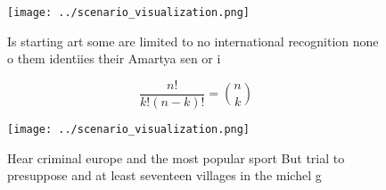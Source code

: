 \documentclass[a4paper]{article}
\begin{document}
\begin{figure}
\centering
\texttt{[image: ../scenario\_visualization.png]}
\caption{Is starting art some are limited to no international recognition none o them identiies their Amartya sen or i
}
\end{figure}
 
\[ \frac{n!}{k!(n-k)!} = \binom{n}{k} \]

\begin{figure}
\centering
\texttt{[image: ../scenario\_visualization.png]}
\caption{Hear criminal europe and the most popular sport But trial to presuppose and at least seventeen villages in the michel g
}
\end{figure}
 
\end{document}
